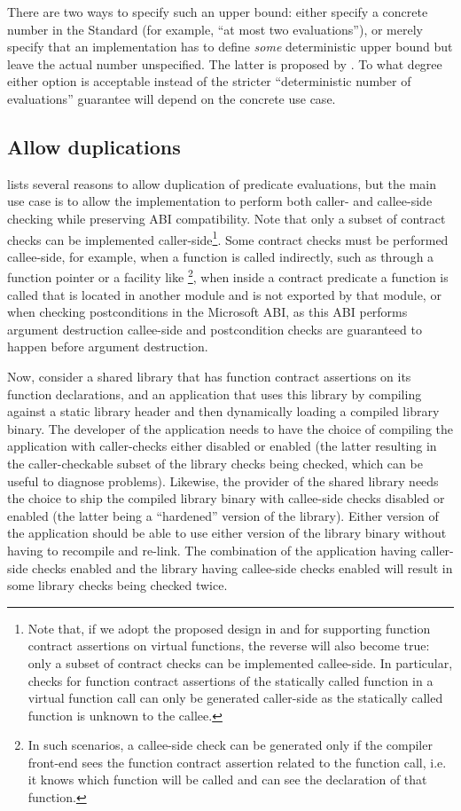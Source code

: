 There are two ways to specify such an upper bound: either specify a concrete number in the Standard (for example, ``at most two evaluations''), or merely specify that an implementation has to define \emph{some} deterministic upper bound but leave the actual number unspecified. The latter is proposed by \cite{P3119R0}. To what degree either option is acceptable instead of the stricter ``deterministic number of evaluations'' guarantee will depend on the concrete use case.

\subsection{Allow duplications}
\label{subsec:ville}

\cite{P2751R1} lists several reasons to allow duplication of predicate evaluations, but the main use case is to allow the implementation to perform both caller- and callee-side checking while preserving ABI compatibility. Note that only a subset of contract checks can be implemented caller-side\footnote{Note that, if we adopt the proposed design in \cite{P3097R0} and \cite{P3165R0} for supporting function contract assertions on virtual functions, the reverse will also become true: only a subset of contract checks can be implemented callee-side. In particular, checks for function contract assertions of the statically called function in a virtual function call can only be generated caller-side as the statically called function is unknown to the callee.}. Some contract checks must be performed callee-side, for example, when a function is called indirectly, such as through a function pointer or a facility like \footnote{In such scenarios, a callee-side check can be generated only if the compiler front-end sees the function contract assertion related to the function call, i.e. it knows which function will be called and can see the declaration of that function.}, when inside a contract predicate a function is called that is located in another module and is not exported by that module, or when checking postconditions in the Microsoft ABI, as this ABI performs argument destruction callee-side and postcondition checks are guaranteed to happen before argument destruction. 

Now, consider a shared library that has function contract assertions on its function declarations, and an application that uses this library by compiling against a static library header and then dynamically loading a compiled library binary. The developer of the application needs to have the choice of compiling the application with caller-checks either disabled or enabled (the latter resulting in the caller-checkable subset of the library checks being checked, which can be useful to diagnose problems). Likewise, the provider of the shared library needs the choice to ship the compiled library binary with callee-side checks disabled or enabled (the latter being a ``hardened'' version of the library). Either version of the application should be able to use either version of the library binary without having to recompile and re-link. The combination of the application having caller-side checks enabled and the library having callee-side checks enabled will result in some library checks being checked twice.

